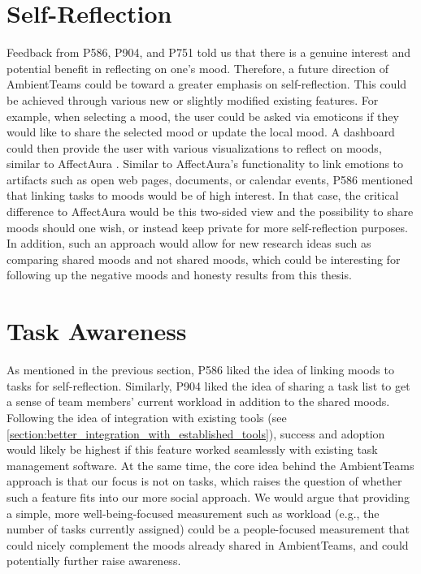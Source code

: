 \section{Self-Reflection}
Feedback from P586, P904, and P751 told us that there is a genuine interest and potential benefit in reflecting on one's mood. Therefore, a future direction of AmbientTeams could be toward a greater emphasis on self-reflection. This could be achieved through various new or slightly modified existing features. For example, when selecting a mood, the user could be asked via emoticons if they would like to share the selected mood or update the local mood. A dashboard could then provide the user with various visualizations to reflect on moods, similar to AffectAura \autocite{mcduff2012affectaura}. Similar to AffectAura's functionality to link emotions to artifacts such as open web pages, documents, or calendar events, P586 mentioned that linking tasks to moods would be of high interest. In that case, the critical difference to AffectAura would be this two-sided view and the possibility to share moods should one wish, or instead keep private for more self-reflection purposes. In addition, such an approach would allow for new research ideas such as comparing shared moods and not shared moods, which could be interesting for following up the negative moods and honesty results from this thesis.

\section{Task Awareness}
As mentioned in the previous section, P586 liked the idea of linking moods to tasks for self-reflection. Similarly, P904 liked the idea of sharing a task list to get a sense of team members' current workload in addition to the shared moods. Following the idea of integration with existing tools (see \autoref{section:better_integration_with_established_tools}), success and adoption would likely be highest if this feature worked seamlessly with existing task management software. At the same time, the core idea behind the AmbientTeams approach is that our focus is not on tasks, which raises the question of whether such a feature fits into our more social approach. We would argue that providing a simple, more well-being-focused measurement such as workload (e.g., the number of tasks currently assigned) could be a people-focused measurement that could nicely complement the moods already shared in AmbientTeams, and could potentially further raise awareness.

